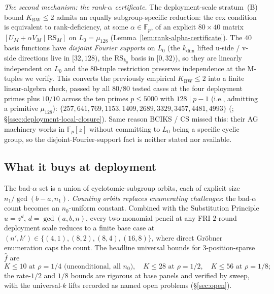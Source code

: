 \documentclass[11pt]{article}
\theoremstyle{definition}
\theoremstyle{remark}
\begin{document}
\smallskip\noindent
\emph{The second mechanism: the rank-$\alpha$ certificate.} The
deployment-scale stratum~(B) bound $K_{\mathrm{BW}} \leq 2$ admits an
equally subgroup-specific reduction: the cex condition is equivalent
to rank-deficiency, at some $\alpha \in \mathbb{F}_p$, of an explicit
$80 \times 40$ matrix $[U_M + \alpha V_M \mid \mathrm{RS}_M]$ on
$L_0 = \mu_{128}$ (Lemma~\ref{lem:rank-alpha-certificate}). The
$40$ basis functions have \emph{disjoint Fourier supports} on $L_0$
(the $k_{\dim}$ lifted u-side / v-side directions live in $[32, 128)$,
the $\mathrm{RS}_{k_0}$ basis in $[0, 32)$), so they are linearly
independent on $L_0$ and the $80$-tuple restriction preserves
independence at the M-tuples we verify. This converts the previously
empirical $K_{\mathrm{BW}} \leq 2$ into a finite linear-algebra check,
passed by all $80/80$ tested cases at the four deployment primes plus
$10/10$ across the ten primes $p \leq 5000$ with
$128 \mid p - 1$ (i.e., admitting a primitive $\mu_{128}$):
$\{257, 641, 769, 1153, 1409, 2689, 3329, 3457, 4481, 4993\}$
(\cite{CompanionRepo};
\S\ref{ssec:deployment-local-closure}). Same reason BCIKS / CS missed
this: their AG machinery works in $\mathbb{F}_p[z]$ without committing
to $L_0$ being a specific cyclic group, so the disjoint-Fourier-support
fact is neither stated nor available.

\subsection{What it buys at deployment}
\label{ssec:what-it-buys}

The bad-$\alpha$ set is a union of cyclotomic-subgroup orbits, each of
explicit size $n_1 / \gcd(b{-}a, n_1)$. \emph{Counting orbits replaces
enumerating challenges}: the bad-$\alpha$ count becomes an
$n_0$-uniform constant. Combined with the Substitution Principle
$u = z^d$, $d = \gcd(a, b, n)$, every two-monomial pencil at any FRI
$2$-round deployment scale reduces to a finite base case at
$(n', k') \in \{(4, 1), (8, 2), (8, 4), (16, 8)\}$, where direct
Gr\"obner enumeration caps the count. The headline universal bounds
for $3$-position-sparse $\hat f$ are
\[
 K \leq 10 \text{ at } \rho{=}1/4 \text{ (unconditional, all } n_0),
 \quad K \leq 28 \text{ at } \rho{=}1/2,
 \quad K \leq 56 \text{ at } \rho{=}1/8;
\]
the rate-$1/2$ and $1/8$ bounds are rigorous at base panels and
verified by sweep, with the universal-$k$ lifts recorded as named
open problems (\S\ref{sec:open}).
\end{document}

